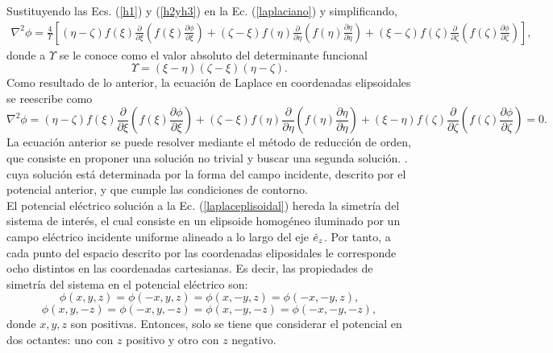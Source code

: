 Sustituyendo las Ecs. (\ref{h1}) y (\ref{h2yh3}) en la Ec. (\ref{laplaciano}) y simplificando,
\begin{align*}
	\nabla^2\phi=\frac{4}{\Upsilon}\left[(\eta-\zeta)f(\xi)\frac{\partial}{\partial\xi}\left(f(\xi)\frac{\partial\phi}{\partial\xi}\right)+(\zeta-\xi)f(\eta)\frac{\partial}{\partial\eta}\left(f(\eta)\frac{\partial\eta}{\partial\eta}\right)+(\xi-\zeta)f(\zeta)\frac{\partial}{\partial\zeta}\left(f(\zeta)\frac{\partial\phi}{\partial\zeta}\right)\right],
\end{align*}
donde a $\Upsilon$ se le conoce como el valor absoluto del determinante funcional \cite{Kellogg}
\begin{equation}
	\Upsilon=(\xi-\eta)(\zeta-\xi)(\eta-\zeta).
\end{equation}
Como resultado de lo anterior, la ecuación de Laplace en coordenadas elipsoidales se reescribe como
\begin{equation}
	\nabla^2\phi=(\eta-\zeta)f(\xi)\frac{\partial}{\partial\xi}\left(f(\xi)\frac{\partial\phi}{\partial\xi}\right)+(\zeta-\xi)f(\eta)\frac{\partial}{\partial\eta}\left(f(\eta)\frac{\partial\eta}{\partial\eta}\right)+(\xi-\eta)f(\zeta)\frac{\partial}{\partial\zeta}\left(f(\zeta)\frac{\partial\phi}{\partial\zeta}\right)=0.
	\label{laplaceplisoidal}
\end{equation}
La ecuación anterior se puede resolver mediante el método de reducción de orden, que consiste en proponer una solución no trivial y buscar una segunda solución. \cite{Braun}. cuya solución está determinada por la forma del campo incidente, descrito por el potencial anterior, y que cumple las condiciones de contorno. \\


El potencial eléctrico solución a la Ec. (\ref{laplaceplisoidal}) hereda la simetría del sistema de interés, el cual consiste en un elipsoide homogéneo iluminado por un campo eléctrico incidente uniforme alineado a lo largo del eje $\hat{e}_{z}$. Por tanto,  a cada punto del espacio descrito por las coordenadas eliposidales le corresponde ocho distintos en las coordenadas cartesianas. Es decir, las propiedades de simetría del sistema en el potencial eléctrico son:
\begin{equation}
    \phi(x,y,z)=\phi(-x,y,z)=\phi(x,-y,z)=\phi(-x,-y,z),
\end{equation}
\begin{equation}
    \phi(x,y,-z)=\phi(-x,y ,-z)=\phi(x,-y,-z)=\phi(-x,-y,-z),
\end{equation}
donde $x,y,z$ son positivas. Entonces, solo se tiene que considerar el potencial en dos octantes: uno con $z$ positivo y otro con $z$ negativo. \\

